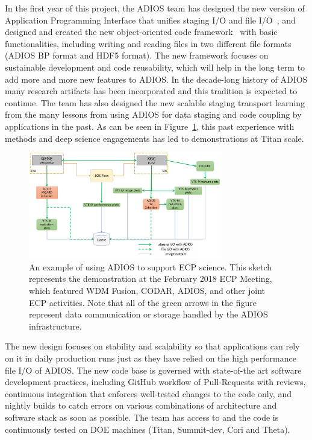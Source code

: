 In the first year of this project, the ADIOS team has designed the new version of Application Programming Interface that unifies staging I/O and file I/O~\cite{ADIOS2-docs}, and designed and created the new object-oriented code framework~\cite{ADIOS2-git} with basic functionalities, including writing and reading files in two different file formats (ADIOS BP format and HDF5 format). The new framework focuses on sustainable development and code reusability, which will help in the long term to add more and more new features to ADIOS. In the decade-long history of ADIOS many research artifacts has been incorporated and this tradition is expected to continue. The team has also designed the new scalable staging transport learning from the many lessons from using ADIOS for data staging and code coupling by applications in the past. As can be seen in Figure~\ref{fig:adios-example}, this past experience with methods and deep science engagements has led to demonstrations at Titan scale.

\begin{figure}[!th]
	\begin{center}
		\includegraphics[width=0.75\textwidth]{projects/2.3.4-DataViz/2.3.4.09-ADIOS/ADIOS_in_ECP.png}
		\caption{An example of using ADIOS to support ECP science.  This sketch represents the demonstration at the February 2018 ECP Meeting, which featured WDM Fusion, CODAR, ADIOS, and other joint ECP activities.  Note that all of the green arrows in the figure represent data communication or storage handled by the ADIOS infrastructure.}
		\label{fig:adios-example}
	\end{center}
\end{figure}

The new design focuses on stability and scalability so that applications can rely on it in daily production runs just as they have relied on the high performance file I/O of ADIOS. The new code base is governed with state-of-the art software development practices, including GitHub workflow of Pull-Requests with reviews, continuous integration that enforces well-tested changes to the code only, and nightly builds to catch errors on various combinations of architecture and software stack as soon as possible. The team has access to and the code is continuously tested on DOE machines (Titan, Summit-dev, Cori and Theta). 



